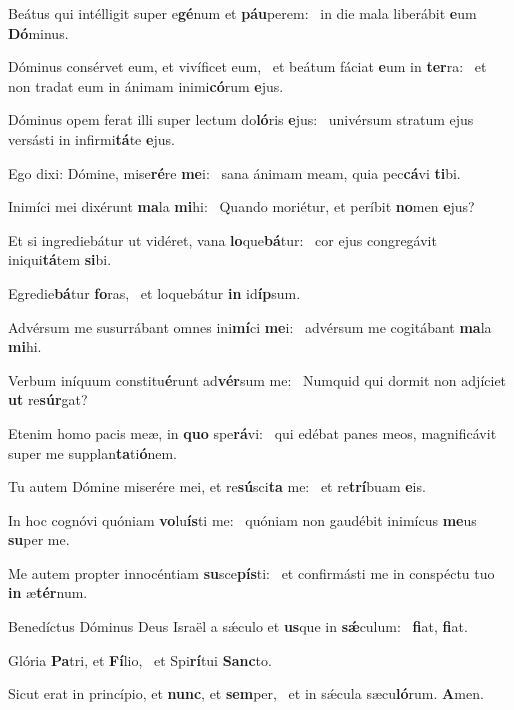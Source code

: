 \item Beátus qui intélligit super e\textbf{gé}num et \textbf{páu}perem:~\psstar{} in die mala liberábit \textbf{e}um \textbf{Dó}minus.
\item Dóminus consérvet eum, et vivíficet eum,~\pscross{} et beátum fáciat \textbf{e}um in \textbf{ter}ra:~\psstar{} et non tradat eum in ánimam inimi\textbf{có}rum \textbf{e}jus.
\item Dóminus opem ferat illi super lectum do\textbf{ló}ris \textbf{e}jus:~\psstar{} univérsum stratum ejus versásti in infirmi\textbf{tá}te \textbf{e}jus.
\item Ego dixi: Dómine, mise\textbf{ré}re \textbf{me}i:~\psstar{} sana ánimam meam, quia pec\textbf{cá}vi \textbf{ti}bi.
\item Inimíci mei dixérunt \textbf{ma}la \textbf{mi}hi:~\psstar{} Quando moriétur, et períbit \textbf{no}men \textbf{e}jus?
\item Et si ingrediebátur ut vidéret, vana \textbf{lo}que\textbf{bá}tur:~\psstar{} cor ejus congregávit iniqui\textbf{tá}tem \textbf{si}bi.
\item Egredie\textbf{bá}tur \textbf{fo}ras,~\psstar{} et loquebátur \textbf{in} id\textbf{íp}sum.
\item Advérsum me susurrábant omnes ini\textbf{mí}ci \textbf{me}i:~\psstar{} advérsum me cogitábant \textbf{ma}la \textbf{mi}hi.
\item Verbum iníquum constitu\textbf{é}runt ad\textbf{vér}sum me:~\psstar{} Numquid qui dormit non adjíciet \textbf{ut} re\textbf{súr}gat?
\item Etenim homo pacis meæ, in \textbf{quo} spe\textbf{rá}vi:~\psstar{} qui edébat panes meos, magnificávit super me supplan\textbf{ta}ti\textbf{ó}nem.
\item Tu autem Dómine miserére mei, et re\textbf{sú}sci\textbf{ta} me:~\psstar{} et re\textbf{trí}buam \textbf{e}is.
\item In hoc cognóvi quóniam \textbf{vo}lu\textbf{ís}ti me:~\psstar{} quóniam non gaudébit inimícus \textbf{me}us \textbf{su}per me.
\item Me autem propter innocéntiam \textbf{su}sce\textbf{pís}ti:~\psstar{} et confirmásti me in conspéctu tuo \textbf{in} æ\textbf{tér}num.
\item Benedíctus Dóminus Deus Israël a sǽculo et \textbf{us}que in \textbf{sǽ}culum:~\psstar{} \textbf{fi}at, \textbf{fi}at.
\item Glória \textbf{Pa}tri, et \textbf{Fí}lio,~\psstar{} et Spi\textbf{rí}tui \textbf{Sanc}to.
\item Sicut erat in princípio, et \textbf{nunc}, et \textbf{sem}per,~\psstar{} et in sǽcula sæcu\textbf{ló}rum. \textbf{A}men.
